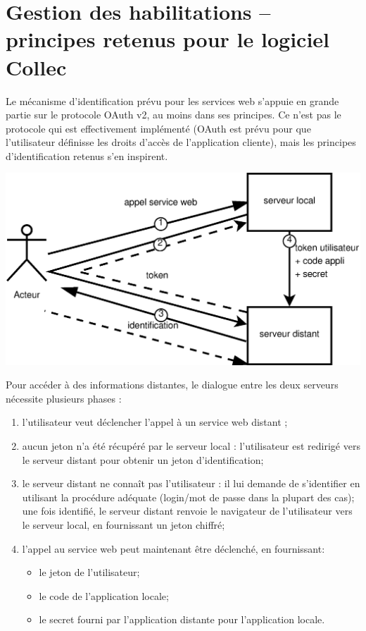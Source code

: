 \chapter{Gestion des habilitations -- principes retenus pour le logiciel Collec}
\label{oauth}

Le mécanisme d'identification prévu pour les services web s'appuie en grande partie sur le protocole OAuth v2, au moins dans ses principes. Ce n'est pas le protocole qui est effectivement implémenté (OAuth est prévu pour que l'utilisateur définisse les droits d'accès de l'application cliente), mais les principes d'identification retenus s'en inspirent.

\includegraphics[width=\linewidth]{images/appel_sw_identification}

Pour accéder à des informations distantes, le dialogue entre les deux serveurs nécessite plusieurs phases :
\begin{enumerate}
\item l'utilisateur veut déclencher l'appel à un service web distant ;
\item aucun jeton n'a été récupéré par le serveur local : l'utilisateur est redirigé vers le serveur distant pour obtenir un jeton d'identification;
\item le serveur distant ne connaît pas l'utilisateur : il lui demande de s'identifier en utilisant la procédure adéquate (login/mot de passe dans la plupart des cas);
\\une fois identifié, le serveur distant renvoie le navigateur de l'utilisateur vers le serveur local, en fournissant un jeton chiffré;
\item l'appel au service web peut maintenant être déclenché, en fournissant:
\begin{itemize}
\item le jeton de l'utilisateur;
\item le code de l'application locale;
\item le secret fourni par l'application distante pour l'application locale.
\end{itemize}
\end{enumerate}


